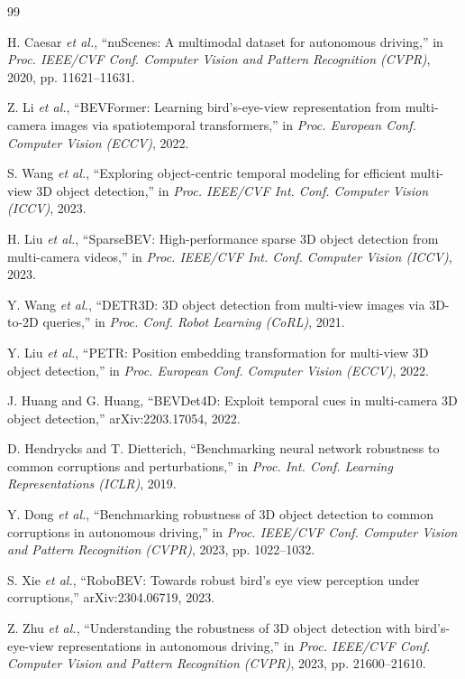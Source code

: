 \documentclass[letterpaper, 10 pt, conference]{ieeeconf}
\begin{document}
\begin{thebibliography}{99}

 H. Caesar \emph{et al.}, ``nuScenes: A multimodal dataset for autonomous driving,'' in \emph{Proc. IEEE/CVF Conf. Computer Vision and Pattern Recognition (CVPR)}, 2020, pp. 11621--11631.

 Z. Li \emph{et al.}, ``BEVFormer: Learning bird's-eye-view representation from multi-camera images via spatiotemporal transformers,'' in \emph{Proc. European Conf. Computer Vision (ECCV)}, 2022.

 S. Wang \emph{et al.}, ``Exploring object-centric temporal modeling for efficient multi-view 3D object detection,'' in \emph{Proc. IEEE/CVF Int. Conf. Computer Vision (ICCV)}, 2023.

 H. Liu \emph{et al.}, ``SparseBEV: High-performance sparse 3D object detection from multi-camera videos,'' in \emph{Proc. IEEE/CVF Int. Conf. Computer Vision (ICCV)}, 2023.

 Y. Wang \emph{et al.}, ``DETR3D: 3D object detection from multi-view images via 3D-to-2D queries,'' in \emph{Proc. Conf. Robot Learning (CoRL)}, 2021.

 Y. Liu \emph{et al.}, ``PETR: Position embedding transformation for multi-view 3D object detection,'' in \emph{Proc. European Conf. Computer Vision (ECCV)}, 2022.

 J. Huang and G. Huang, ``BEVDet4D: Exploit temporal cues in multi-camera 3D object detection,'' arXiv:2203.17054, 2022.

 D. Hendrycks and T. Dietterich, ``Benchmarking neural network robustness to common corruptions and perturbations,'' in \emph{Proc. Int. Conf. Learning Representations (ICLR)}, 2019.

 Y. Dong \emph{et al.}, ``Benchmarking robustness of 3D object detection to common corruptions in autonomous driving,'' in \emph{Proc. IEEE/CVF Conf. Computer Vision and Pattern Recognition (CVPR)}, 2023, pp. 1022--1032.

 S. Xie \emph{et al.}, ``RoboBEV: Towards robust bird's eye view perception under corruptions,'' arXiv:2304.06719, 2023.

 Z. Zhu \emph{et al.}, ``Understanding the robustness of 3D object detection with bird's-eye-view representations in autonomous driving,'' in \emph{Proc. IEEE/CVF Conf. Computer Vision and Pattern Recognition (CVPR)}, 2023, pp. 21600--21610.


\end{thebibliography}
\end{document}
